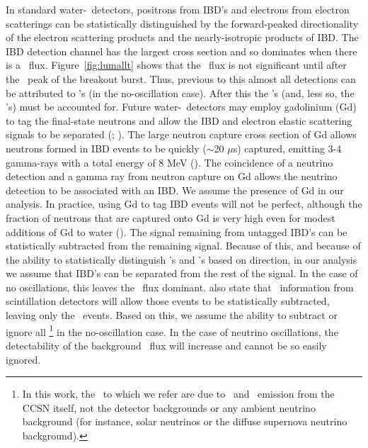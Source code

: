 In standard water-\cer\ detectors, positrons from
IBD's and electrons from 
electron scatterings can be statistically distinguished by the
forward-peaked directionality of the electron scattering products and the
nearly-isotropic products of IBD.
 The IBD
detection channel has the largest cross section and so 
dominates when there is a \anue\ flux.  Figure~\ref{fig:lumallt} shows
that the \anue\ flux is not significant until after the
\nue\ peak of the breakout burst.
Thus, previous to this almost all detections can be attributed
to \nue's (in the no-oscillation case).
After this the \anue's (and, less so, the \nux's) 
must be accounted
for.  Future water-\cer\ detectors may
employ gadolinium (Gd) to tag the final-state neutrons and allow the IBD and
electron elastic scattering signals to be separated
(\citealt{vagins2012}; \citealt{lahabeacom2014}).  The large neutron
capture cross section of Gd allows neutrons formed in IBD events to be
quickly ($\sim$20 $\mu$s) captured, emitting 3-4 gamma-rays with a total
energy of 8 MeV (\citealt{beacomvagins2004}).  
The coincidence of a neutrino
detection and a gamma ray from neutron capture on Gd 
allows the neutrino detection to be associated with an IBD.  We
assume the presence of Gd in our analysis.  In practice, using Gd to
tag IBD events will not be perfect, although the fraction of neutrons
that are captured onto Gd is very high even for modest additions of Gd
to water (\citealt{beacomvagins2004}).  The signal remaining from
untagged IBD's can be statistically subtracted from the remaining signal.
Because of this, and because of the ability to statistically distinguish
\nue's and \anue's based on direction, in our analysis we assume that
IBD's can be separated from the rest of the signal.  In the case of no
oscillations, this leaves the \nue\ flux dominant.
\cite{lahabeacom2014} also state that \nux\ 
information from scintillation detectors 
will allow those events to be statistically subtracted,
leaving only the \nue\ events.  Based on this, we assume the
ability to subtract or ignore all \backgrounds\footnote{In this work,
the \backgrounds\ to which we refer are due to \anue\ and \nux\
emission from the CCSN itself, not the detector backgrounds or any
ambient neutrino background (for instance, solar neutrinos or the
diffuse supernova neutrino background).} in the no-oscillation
case.  In the case of neutrino oscillations, the detectability of the 
background \nux\ flux
will increase and cannot be so easily ignored.

